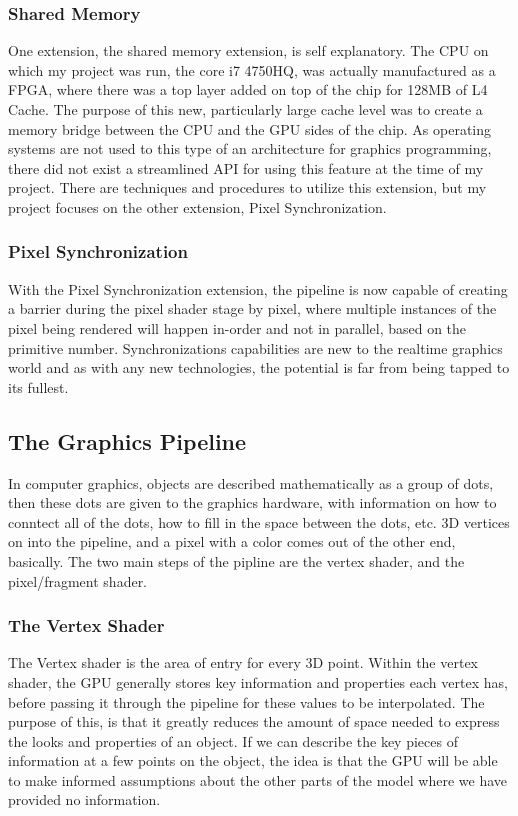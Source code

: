\documentclass[a4paper, 12pt]{article}
\begin{document}
\subsubsection{Shared Memory}

One extension, the shared memory extension, is self explanatory. The CPU on
which my project was run, the core i7 4750HQ, was actually manufactured as a
FPGA, where there was a top layer added on top of the chip for 128MB of L4
Cache. The purpose of this new, particularly large cache level was to create a
memory bridge between the CPU and the GPU sides of the chip. As operating
systems are not used to this type of an architecture for graphics programming,
there did not exist a streamlined API for using this feature at the time of my
project. There are techniques and procedures to utilize this extension, but my
project focuses on the other extension, Pixel Synchronization.

\subsubsection{Pixel Synchronization}

With the Pixel Synchronization extension, the pipeline is now capable of
creating a barrier during the pixel shader stage by pixel, where multiple
instances of the pixel being rendered will happen in-order and not in
parallel, based on the primitive number. Synchronizations capabilities are new
to the realtime graphics world and as with any new technologies, the potential
is far from being tapped to its fullest.

\subsection{The Graphics Pipeline}

In computer graphics, objects are described mathematically as a group of dots,
then these dots are given to the graphics hardware, with information on how to
conntect all of the dots, how to fill in the space between the dots, etc. 3D
vertices on into the pipeline, and a pixel with a color comes out of the other
end, basically. The two main steps of the pipline are the vertex shader, and
the pixel/fragment shader.

\subsubsection{The Vertex Shader}

The Vertex shader is the area of entry for every 3D point. Within the vertex
shader, the GPU generally stores key information and properties each vertex
has, before passing it through the pipeline for these values to be
interpolated. The purpose of this, is that it greatly reduces the amount of
space needed to express the looks and properties of an object. If we can
describe the key pieces of information at a few points on the object, the idea
is that the GPU will be able to make informed assumptions about the other
parts of the model where we have provided no information.
\end{document}
